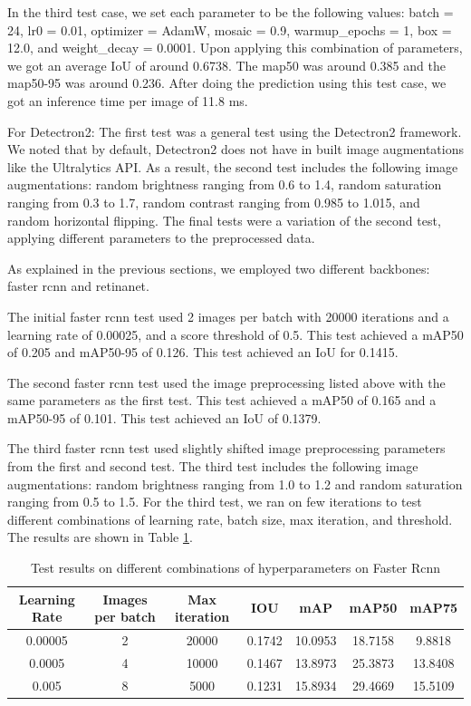 \documentclass[stu,12pt,floatsintext]{apa7}
\begin{document}
In the third test case, we set each parameter to be the following values: batch = 24, lr0 = 0.01, optimizer = AdamW, mosaic = 0.9, warmup\_epochs = 1, box = 12.0, and weight\_decay = 0.0001. Upon applying this combination of parameters, we got an average IoU of around 0.6738. The map50 was around 0.385 and the map50-95 was around 0.236. After doing the prediction using this test case, we got an inference time per image of 11.8 ms. 


For Detectron2:
The first test was a general test using the Detectron2 framework. We noted that by default, Detectron2 does not have in built image augmentations like the Ultralytics API. As a result, the second test includes the following image augmentations: random brightness ranging from 0.6 to 1.4, random saturation ranging from 0.3 to 1.7, random contrast ranging from 0.985 to 1.015, and random horizontal flipping. The final tests were a variation of the second test, applying different parameters to the preprocessed data.

As explained in the previous sections, we employed two different backbones: faster rcnn and retinanet.

The initial faster rcnn test used 2 images per batch with 20000 iterations and a learning rate of 0.00025, and a score threshold of 0.5. This test achieved a mAP50 of 0.205 and mAP50-95 of 0.126. This test achieved an IoU for 0.1415. %

The second faster rcnn test used the image preprocessing listed above with the same parameters as the first test. This test achieved a mAP50 of 0.165 and a mAP50-95 of 0.101. This test achieved an IoU of 0.1379. 

The third faster rcnn test used slightly shifted image preprocessing parameters from the first and second test. The third test includes the following image augmentations: random brightness ranging from 1.0 to 1.2 and random saturation ranging from 0.5 to 1.5. For the third test, we ran on few iterations to test different combinations of learning rate, batch size, max iteration, and threshold. The results are shown in Table \ref{tab:fasterrcnn}. 

\begin{table}[!htb]
	\centering
	\caption{Test results on different combinations of hyperparameters on Faster Rcnn}
	\begin{tabular}{ccccccc}
		\hline
        Learning Rate & Images per batch & Max iteration & IOU & mAP & mAP50 & mAP75 \\
        \hline
        0.00005	 & 2 & 20000 & 0.1742 & 10.0953 & 18.7158 & 9.8818 \\
        0.0005	 & 4 & 10000 & 0.1467 & 13.8973 & 25.3873 & 13.8408 \\
        0.005    & 8 & 5000 & 0.1231 & 15.8934 & 29.4669 & 15.5109 \\
		\hline
	\end{tabular}
	\label{tab:fasterrcnn}
\end{table}
\end{document}
